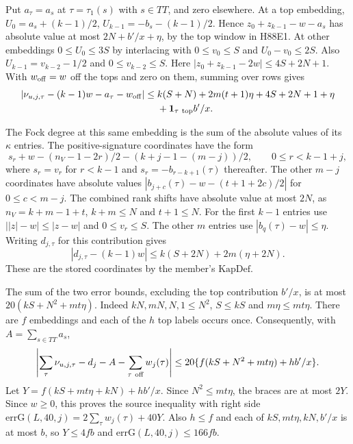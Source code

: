 Put $a_\tau=a_s$ at $\tau=\tau_1(s)$ with $s\in TT$, and zero
elsewhere. At a top embedding,
$U_0=a_s+(k-1)/2$, $U_{k-1}=-b_s-(k-1)/2$. Hence
$z_0+z_{k-1}-w-a_s$ has absolute value at most
$2N+b'/x+\eta$, by the top window in H88E1. At other embeddings
$0\le U_0\le3S$ by interlacing with
$0\le v_0\le S$ and $U_0-v_0\le2S$.
Also $U_{k-1}=v_{k-2}-1/2$ and $0\le v_{k-2}\le S$.
Here $|z_0+z_{k-1}-2w|\le4S+2N+1$. With
$w_{\rm off}=w$ off the tops and zero on them, summing over rows gives
\[
 \begin{split}
 |\nu_{u,j,\tau}-(k-1)w-a_\tau-w_{\rm off}|
 \le {}&k(S+N)+2m(t+1)\eta+4S+2N+1+\eta\\
       &+{\bf1}_{\tau\ {\rm top}}b'/x .
 \end{split}
\]

The Fock degree at this same embedding is the sum of the absolute
values of its $\kappa$ entries. The positive-signature coordinates
have the form
\[
 s_r+w-(n_V-1-2r)/2-(k+j-1-(m-j))/2,
 \qquad 0\le r<k-1+j ,
\]
where $s_r=v_r$ for $r<k-1$ and $s_r=-b_{r-k+1}(\tau)$ thereafter.
The other $m-j$ coordinates have absolute values
$|b_{j+c}(\tau)-w-(t+1+2c)/2|$ for $0\le c<m-j$.
The combined rank shifts have absolute value at most $2N$,
as $n_V=k+m-1+t$, $k+m\le N$ and $t+1\le N$.
For the first $k-1$ entries use
$\big||z|-w\big|\le |z-w|$ and $0\le v_r\le S$.
The other $m$ entries use $|b_q(\tau)-w|\le\eta$.
Writing $d_{j,\tau}$ for this contribution gives
\[
 |d_{j,\tau}-(k-1)w|\le k(S+2N)+2m(\eta+2N).
\]
These are the stored coordinates by the member's $\mathrm{KapDef}$.

The sum of the two error bounds, excluding the top contribution
$b'/x$, is at most $20(kS+N^2+mt\eta)$. Indeed $kN,mN,N,1\le N^2$,
$S\le kS$ and $m\eta\le mt\eta$.
There are $f$ embeddings and each of the $h$ top labels occurs once.
Consequently, with $A=\sum_{s\in TT}a_s$,
\[
 \left|\sum_\tau \nu_{u,j,\tau}-d_j-A-
                         \sum_{\tau\ {\rm off}}w_j(\tau)\right|
 \le20\{f(kS+N^2+mt\eta)+h b'/x\}.
\]
Let $Y=f(kS+mt\eta+kN)+hb'/x$. Since $N^2\le mt\eta$,
the braces are at most $2Y$. Since $w\ge0$, this proves
the source inequality with right side
$\mathrm{errG}(L,40,j)=2\sum_\tau w_j(\tau)+40Y$.
Also $h\le f$ and each of $kS,mt\eta,kN,b'/x$ is at most $b$,
so $Y\le4fb$ and $\mathrm{errG}(L,40,j)\le166fb$.

